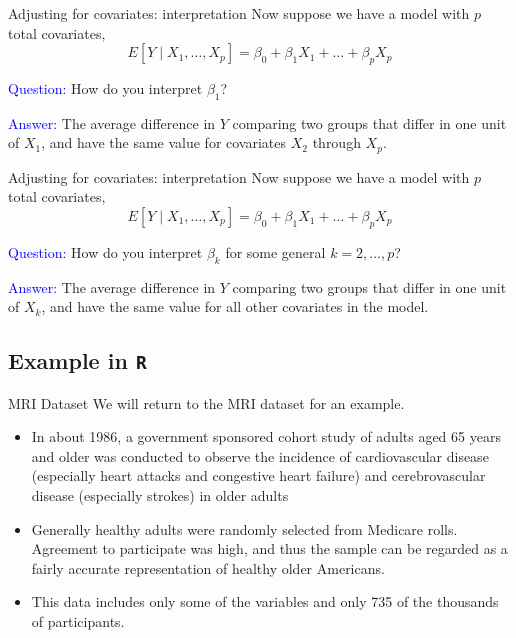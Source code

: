 \documentclass[10pt,t]{beamer}
\begin{document}
\begin{frame}{Adjusting for covariates: interpretation}
Now suppose we have a model with $p$ total covariates,
$$
E[Y \mid X_1, \dots, X_p] = \beta_0 + \beta_1 X_1 + \dots + \beta_p X_p
$$

\textcolor{blue}{Question:} How do you interpret $\beta_1$? \pause

\vspace{0.3cm}

\textcolor{blue}{Answer:} The average difference in $Y$ comparing two groups that differ in one unit of $X_1$, and have the same value for covariates $X_2$ through $X_p$.
\end{frame}

\begin{frame}{Adjusting for covariates: interpretation}
Now suppose we have a model with $p$ total covariates,
$$
E[Y \mid X_1, \dots, X_p] = \beta_0 + \beta_1 X_1 + \dots + \beta_p X_p
$$

\textcolor{blue}{Question:} How do you interpret $\beta_k$ for some general $k = 2, \dots, p$? \pause

\vspace{0.3cm}

\textcolor{blue}{Answer:} The average difference in $Y$ comparing two groups that differ in one unit of $X_k$, and have the same value for all other covariates in the model. 
\end{frame}

\subsection{Example in \texttt{R}}

\begin{frame}{MRI Dataset}
	We will return to the MRI dataset for an example.
	\medskip
	
	\begin{itemize}
		\item In about 1986, a government sponsored cohort study of adults aged 65 years and older was conducted to observe the incidence of cardiovascular disease (especially heart attacks and congestive heart failure) and cerebrovascular disease (especially strokes) in older adults
		\medskip
		
		\item Generally healthy adults were randomly selected from Medicare rolls. Agreement to participate was high, and thus the sample can be regarded as a fairly accurate representation of healthy older Americans. 
		\medskip
		
		\item  This data includes only some of the variables and only 735 of the thousands of participants.
		
	\end{itemize}

\end{frame}
\end{document}
